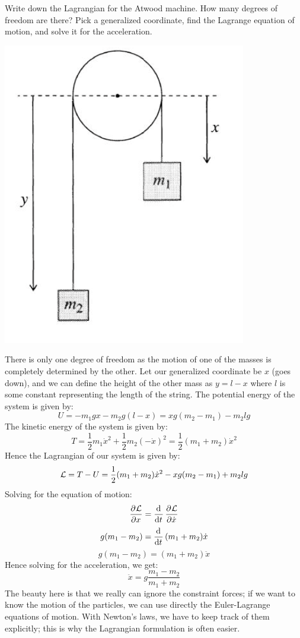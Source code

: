 \begin{p}
Write down the Lagrangian for the Atwood machine. How many degrees of freedom are there? Pick a generalized coordinate, find the Lagrange equation of motion, and solve it for the acceleration.
\begin{center}
    \includegraphics[scale=0.6]{Lecture-4/W4-img1.png}
\end{center}
\end{p}
\begin{s}
There is only one degree of freedom as the motion of one of the masses is completely determined by the other. Let our generalized coordinate be $x$ (goes down), and we can define the height of the other mass as $y = l - x$ where $l$ is some constant representing the length of the string. The potential energy of the system is given by:
\[U = -m_1gx - m_2g(l-x) = xg(m_2-m_1) - m_2lg\]
The kinetic energy of the system is given by:
\[T = \frac{1}{2}m_1\dot{x}^2 + \frac{1}{2}m_2(-\dot{x})^2 = \frac{1}{2}(m_1 + m_2)\dot{x}^2\]
Hence the Lagrangian of our system is given by:
\[\mathcal{L} = T - U = \frac{1}{2}(m_1 + m_2)\dot{x}^2 - xg(m_2-m_1) + m_2lg\]
Solving for the equation of motion:
\[\dpd{\LL}{x} = \dod{}{t}\dpd{\LL}{\dot{x}}\]
\[g(m_1 - m_2) = \dod{}{t}(m_1 + m_2)\dot{x}\]
\[g(m_1 - m_2) = (m_1 + m_2)\ddot{x}\]
Hence solving for the acceleration, we get:
\[\ddot{x} = g\frac{m_1 - m_2}{m_1 + m_2}\]
The beauty here is that we really can ignore the constraint forces; if we want to know the motion of the particles, we can use directly the Euler-Lagrange equations of motion. With Newton's laws, we have to keep track of them explicitly; this is why the Lagrangian formulation is often easier.
\end{s}

